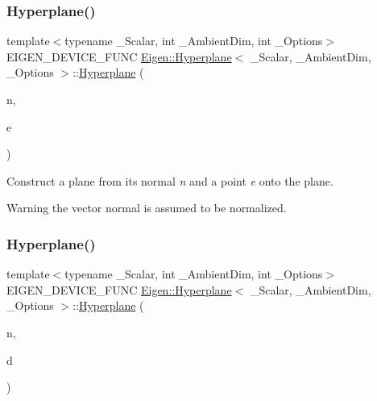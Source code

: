 \subsubsection{\texorpdfstring{Hyperplane()}{Hyperplane()}\hspace{0.1cm}{\footnotesize\ttfamily [3/6]}}
{\footnotesize\ttfamily template$<$typename \+\_\+\+Scalar, int \+\_\+\+Ambient\+Dim, int \+\_\+\+Options$>$ \\
E\+I\+G\+E\+N\+\_\+\+D\+E\+V\+I\+C\+E\+\_\+\+F\+U\+NC \mbox{\hyperlink{class_eigen_1_1_hyperplane}{Eigen\+::\+Hyperplane}}$<$ \+\_\+\+Scalar, \+\_\+\+Ambient\+Dim, \+\_\+\+Options $>$\+::\mbox{\hyperlink{class_eigen_1_1_hyperplane}{Hyperplane}} (\begin{DoxyParamCaption}\item[{const \mbox{\hyperlink{class_eigen_1_1_matrix}{Vector\+Type}} \&}]{n,  }\item[{const \mbox{\hyperlink{class_eigen_1_1_matrix}{Vector\+Type}} \&}]{e }\end{DoxyParamCaption})\hspace{0.3cm}{\ttfamily [inline]}}

Construct a plane from its normal {\itshape n} and a point {\itshape e} onto the plane. \begin{DoxyWarning}{Warning}
the vector normal is assumed to be normalized. 
\end{DoxyWarning}
\mbox{\label{class_eigen_1_1_hyperplane_a1375e9d62e54a5ada49b6367ee2eaa8d}} 
\subsubsection{\texorpdfstring{Hyperplane()}{Hyperplane()}\hspace{0.1cm}{\footnotesize\ttfamily [4/6]}}
{\footnotesize\ttfamily template$<$typename \+\_\+\+Scalar, int \+\_\+\+Ambient\+Dim, int \+\_\+\+Options$>$ \\
E\+I\+G\+E\+N\+\_\+\+D\+E\+V\+I\+C\+E\+\_\+\+F\+U\+NC \mbox{\hyperlink{class_eigen_1_1_hyperplane}{Eigen\+::\+Hyperplane}}$<$ \+\_\+\+Scalar, \+\_\+\+Ambient\+Dim, \+\_\+\+Options $>$\+::\mbox{\hyperlink{class_eigen_1_1_hyperplane}{Hyperplane}} (\begin{DoxyParamCaption}\item[{const \mbox{\hyperlink{class_eigen_1_1_matrix}{Vector\+Type}} \&}]{n,  }\item[{const Scalar \&}]{d }\end{DoxyParamCaption})\hspace{0.3cm}{\ttfamily [inline]}}

